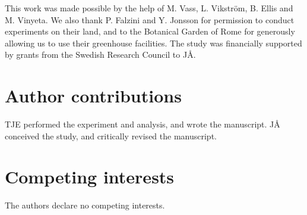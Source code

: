 \documentclass[twocolumn,twoside,lettersize]{article}
\begin{document}
This work was made possible by the help of M. Vass, L. Vikström, B. Ellis and M. Vinyeta. We also thank P. Falzini and Y. Jonsson for permission to conduct experiments on their land, and to the Botanical Garden of Rome for generously allowing us to use their greenhouse facilities. The study was financially supported by grants from the Swedish Research Council to JÅ.

\section*{Author contributions}

TJE performed the experiment and analysis, and wrote the manuscript. JÅ conceived the study, and critically revised the manuscript.

\section*{Competing interests}

The authors declare no competing interests.

\printbibliography
\end{document}
